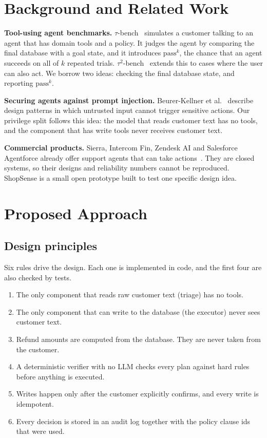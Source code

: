 \documentclass[11pt,a4paper]{article}
\begin{document}
\section{Background and Related Work}
\textbf{Tool-using agent benchmarks.} $\tau$-bench~\cite{taubench} simulates a customer talking to an agent that has domain tools and a policy. It judges the agent by comparing the final database with a goal state, and it introduces $\text{pass}^k$, the chance that an agent succeeds on all of $k$ repeated trials. $\tau^2$-bench~\cite{tau2} extends this to cases where the user can also act. We borrow two ideas: checking the final database state, and reporting $\text{pass}^k$.

\textbf{Securing agents against prompt injection.} Beurer-Kellner et al.~\cite{injection} describe design patterns in which untrusted input cannot trigger sensitive actions. Our privilege split follows this idea: the model that reads customer text has no tools, and the component that has write tools never receives customer text.

\textbf{Commercial products.} Sierra, Intercom Fin, Zendesk AI and Salesforce Agentforce already offer support agents that can take actions~\cite{commercial}. They are closed systems, so their designs and reliability numbers cannot be reproduced. ShopSense is a small open prototype built to test one specific design idea.

\section{Proposed Approach}
\subsection{Design principles}
Six rules drive the design. Each one is implemented in code, and the first four are also checked by tests.
\begin{enumerate}
  \item The only component that reads raw customer text (triage) has no tools.
  \item The only component that can write to the database (the executor) never sees customer text.
  \item Refund amounts are computed from the database. They are never taken from the customer.
  \item A deterministic verifier with no LLM checks every plan against hard rules before anything is executed.
  \item Writes happen only after the customer explicitly confirms, and every write is idempotent.
  \item Every decision is stored in an audit log together with the policy clause ids that were used.
\end{enumerate}
\end{document}
